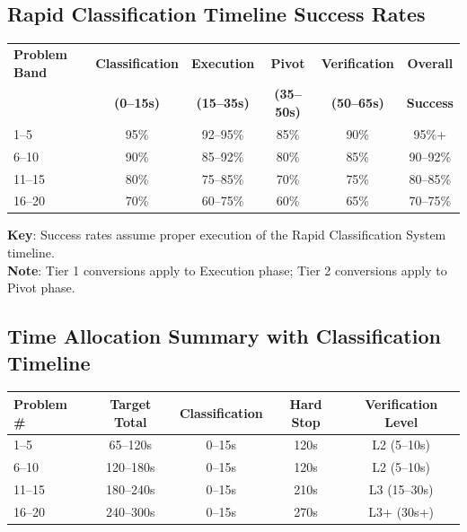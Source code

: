 \documentclass{article}
\begin{document}
\subsection{Rapid Classification Timeline Success Rates}

\begin{center}
\begin{tabular}{|l|c|c|c|c|c|}
\hline
\textbf{Problem Band} & \textbf{Classification} & \textbf{Execution} & \textbf{Pivot} & \textbf{Verification} & \textbf{Overall} \\
& \textbf{(0--15s)} & \textbf{(15--35s)} & \textbf{(35--50s)} & \textbf{(50--65s)} & \textbf{Success} \\
\hline
1--5 & 95\% & 92--95\% & 85\% & 90\% & 95\%+ \\
6--10 & 90\% & 85--92\% & 80\% & 85\% & 90--92\% \\
11--15 & 80\% & 75--85\% & 70\% & 75\% & 80--85\% \\
16--20 & 70\% & 60--75\% & 60\% & 65\% & 70--75\% \\
\hline
\end{tabular}
\end{center}

\textbf{Key}: Success rates assume proper execution of the Rapid Classification System timeline.\\
\textbf{Note}: Tier 1 conversions apply to Execution phase; Tier 2 conversions apply to Pivot phase.

\subsection{Time Allocation Summary with Classification Timeline}

\begin{center}
\begin{tabular}{|l|c|c|c|c|}
\hline
\textbf{Problem \#} & \textbf{Target Total} & \textbf{Classification} & \textbf{Hard Stop} & \textbf{Verification Level} \\
\hline
1--5 & 65--120s & 0--15s & 120s & L2 (5--10s) \\
6--10 & 120--180s & 0--15s & 120s & L2 (5--10s) \\
11--15 & 180--240s & 0--15s & 210s & L3 (15--30s) \\
16--20 & 240--300s & 0--15s & 270s & L3+ (30s+) \\
\hline
\end{tabular}
\end{center}
\end{document}
